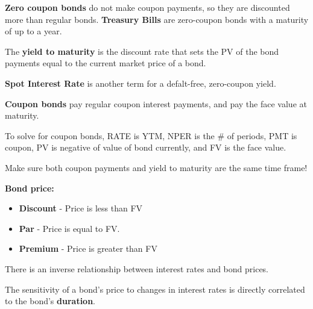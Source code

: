 \documentclass[english, 12pt]{article}
\begin{document}
\begin{defn}
\textbf{Zero coupon bonds} do not make coupon payments, so they are discounted more than regular bonds. \textbf{Treasury Bills} are zero-coupon bonds with a maturity of up to a year.
\end{defn}

\begin{defn}
The \textbf{yield to maturity} is the discount rate that sets the PV of the bond payments equal to the current market price of a bond.
\end{defn}

\begin{defn}
\textbf{Spot Interest Rate} is another term for a defalt-free, zero-coupon yield.
\end{defn}

\begin{defn}
\textbf{Coupon bonds} pay regular coupon interest payments, and pay the face value at maturity.
\end{defn}

\begin{note}
To solve for coupon bonds, RATE is YTM, NPER is the \# of periods, PMT is coupon, PV is negative of value of bond currently, and FV is the face value.
\end{note}

\begin{qte}
Make sure both coupon payments and yield to maturity are the same time frame!
\end{qte}

\begin{defn}
\textbf{Bond price:}
\begin{itemize}
\item \textbf{Discount} - Price is less than FV
\item \textbf{Par} - Price is equal to FV.
\item \textbf{Premium} - Price is greater than FV
\end{itemize}
\end{defn}

\begin{note}
There is an inverse relationship between interest rates and bond prices.
\end{note}

\begin{qte}
The sensitivity of a bond's price to changes in interest rates is directly correlated to the bond's \textbf{duration}.
\end{qte}
\end{document}
